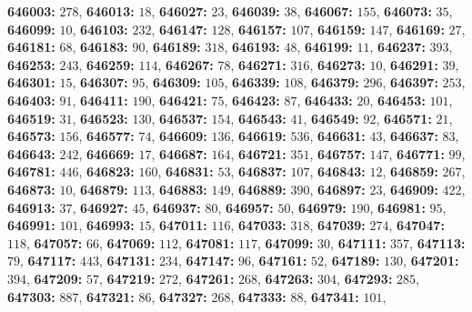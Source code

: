\textsf{\bfseries 646003:} $278$, \textsf{\bfseries 646013:} $18$, \textsf{\bfseries 646027:} $23$, \textsf{\bfseries 646039:} $38$, \textsf{\bfseries 646067:} $155$, \textsf{\bfseries 646073:} $35$, \textsf{\bfseries 646099:} $10$, \textsf{\bfseries 646103:} $232$, \textsf{\bfseries 646147:} $128$, \textsf{\bfseries 646157:} $107$, \textsf{\bfseries 646159:} $147$, \textsf{\bfseries 646169:} $27$, \textsf{\bfseries 646181:} $68$, \textsf{\bfseries 646183:} $90$, \textsf{\bfseries 646189:} $318$, \textsf{\bfseries 646193:} $48$, \textsf{\bfseries 646199:} $11$, \textsf{\bfseries 646237:} $393$, \textsf{\bfseries 646253:} $243$, \textsf{\bfseries 646259:} $114$, \textsf{\bfseries 646267:} $78$, \textsf{\bfseries 646271:} $316$, \textsf{\bfseries 646273:} $10$, \textsf{\bfseries 646291:} $39$, \textsf{\bfseries 646301:} $15$, \textsf{\bfseries 646307:} $95$, \textsf{\bfseries 646309:} $105$, \textsf{\bfseries 646339:} $108$, \textsf{\bfseries 646379:} $296$, \textsf{\bfseries 646397:} $253$, \textsf{\bfseries 646403:} $91$, \textsf{\bfseries 646411:} $190$, \textsf{\bfseries 646421:} $75$, \textsf{\bfseries 646423:} $87$, \textsf{\bfseries 646433:} $20$, \textsf{\bfseries 646453:} $101$, \textsf{\bfseries 646519:} $31$, \textsf{\bfseries 646523:} $130$, \textsf{\bfseries 646537:} $154$, \textsf{\bfseries 646543:} $41$, \textsf{\bfseries 646549:} $92$, \textsf{\bfseries 646571:} $21$, \textsf{\bfseries 646573:} $156$, \textsf{\bfseries 646577:} $74$, \textsf{\bfseries 646609:} $136$, \textsf{\bfseries 646619:} $536$, \textsf{\bfseries 646631:} $43$, \textsf{\bfseries 646637:} $83$, \textsf{\bfseries 646643:} $242$, \textsf{\bfseries 646669:} $17$, \textsf{\bfseries 646687:} $164$, \textsf{\bfseries 646721:} $351$, \textsf{\bfseries 646757:} $147$, \textsf{\bfseries 646771:} $99$, \textsf{\bfseries 646781:} $446$, \textsf{\bfseries 646823:} $160$, \textsf{\bfseries 646831:} $53$, \textsf{\bfseries 646837:} $107$, \textsf{\bfseries 646843:} $12$, \textsf{\bfseries 646859:} $267$, \textsf{\bfseries 646873:} $10$, \textsf{\bfseries 646879:} $113$, \textsf{\bfseries 646883:} $149$, \textsf{\bfseries 646889:} $390$, \textsf{\bfseries 646897:} $23$, \textsf{\bfseries 646909:} $422$, \textsf{\bfseries 646913:} $37$, \textsf{\bfseries 646927:} $45$, \textsf{\bfseries 646937:} $80$, \textsf{\bfseries 646957:} $50$, \textsf{\bfseries 646979:} $190$, \textsf{\bfseries 646981:} $95$, \textsf{\bfseries 646991:} $101$, \textsf{\bfseries 646993:} $15$, \textsf{\bfseries 647011:} $116$, \textsf{\bfseries 647033:} $318$, \textsf{\bfseries 647039:} $274$, \textsf{\bfseries 647047:} $118$, \textsf{\bfseries 647057:} $66$, \textsf{\bfseries 647069:} $112$, \textsf{\bfseries 647081:} $117$, \textsf{\bfseries 647099:} $30$, \textsf{\bfseries 647111:} $357$, \textsf{\bfseries 647113:} $79$, \textsf{\bfseries 647117:} $443$, \textsf{\bfseries 647131:} $234$, \textsf{\bfseries 647147:} $96$, \textsf{\bfseries 647161:} $52$, \textsf{\bfseries 647189:} $130$, \textsf{\bfseries 647201:} $394$, \textsf{\bfseries 647209:} $57$, \textsf{\bfseries 647219:} $272$, \textsf{\bfseries 647261:} $268$, \textsf{\bfseries 647263:} $304$, \textsf{\bfseries 647293:} $285$, \textsf{\bfseries 647303:} $887$, \textsf{\bfseries 647321:} $86$, \textsf{\bfseries 647327:} $268$, \textsf{\bfseries 647333:} $88$, \textsf{\bfseries 647341:} $101$, 
